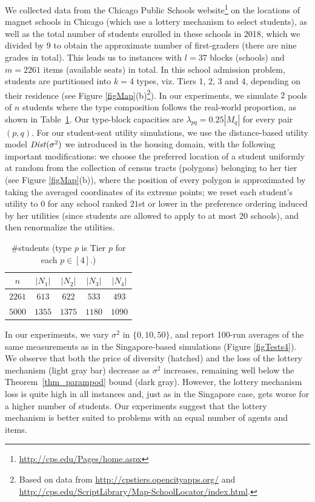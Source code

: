 \documentclass[11pt,dvipdfmx]{article}
\begin{document}
We collected data from the Chicago Public Schools website\footnote{\url{http://cps.edu/Pages/home.aspx}} on the locations of magnet schools in Chicago (which use a lottery mechanism to select students), as well as the total number of students enrolled in these schools in 2018, which we divided by $9$ to obtain the approximate number of first-graders (there are nine grades in total). 
This leads us to instances with $l=37$ blocks (schools) and $m = 2261$ items (available seats) in total. 
In this school admission problem, students are partitioned into $k=4$ types, viz. Tiers 1, 2, 3 and 4, depending on their residence (see Figure \ref{figMap}(b)\footnote{Based on data from \url{http://cpstiers.opencityapps.org/} and \url{http://cps.edu/ScriptLibrary/Map-SchoolLocator/index.html}.}). In our experiments, we simulate $2$ pools of $n$ students where the type composition follows the real-world proportion, as shown in Table~\ref{Chictable}. Our type-block capacities are $\lambda_{pq} = 0.25 |M_q|$ for every pair $(p,q)$. For our student-seat utility simulations, we use the distance-based utility model $\operatorname{\mathit{Dist}}(\sigma^2)$ we introduced in the housing domain, with the following important modifications: 
we choose the preferred location of a student uniformly at random from the collection of census tracts (polygons) belonging to her tier (see Figure \ref{figMap}(b)), where the position of every polygon is approximated by taking the averaged coordinates of its extreme points; we reset each student's utility to $0$ for any school ranked $21$st or lower in the preference ordering induced by her utilities (since students are allowed to apply to at most 20 schools), and then renormalize the utilities.
\begin{table}
\begin{tabular}{|c|c|c|c|c|}
	\hline
	$n$ & $|N_1|$& $|N_2|$& $|N_3|$ & $|N_4|$\\ \hline
	$2261$ & $613$ & $622$ & $533$ & $493$\\
	$5000$ & $1355$ & $1375$ & $1180$ & $1090$\\ \hline
\end{tabular}
\caption{$\#$students (type $p$ is Tier $p$ for each $p \in [4]$.)\label{Chictable}}
\end{table}

In our experiments, we vary $\sigma^2$ in $\{0,10,50\}$, and report 100-run averages of the same measurements as in the Singapore-based simulations (Figure \ref{figTests4}). We observe that both the price of diversity (hatched) and the loss of the lottery mechanism (light gray bar) decrease as $\sigma^2$ increases, remaining well below the Theorem~\ref{thm_parampod} bound (dark gray). However, the lottery mechanism loss is quite high in all instances and, just as in the Singapore case, gets worse for a higher number of students. Our experiments suggest that the lottery mechanism is better suited to problems with an equal number of agents and items.
\end{document}

